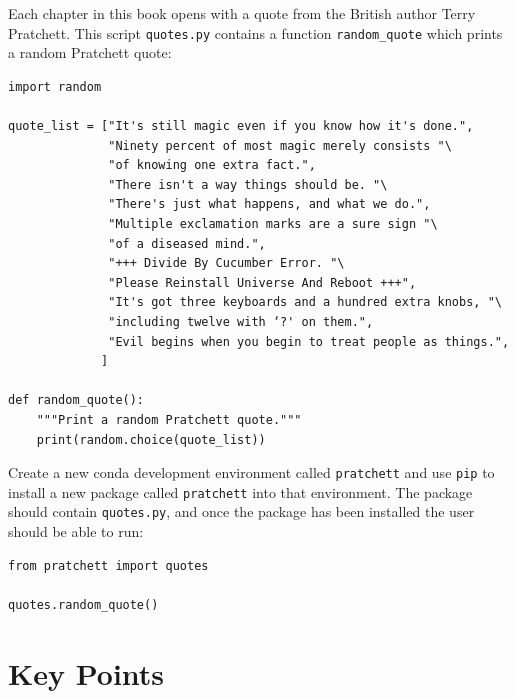 \documentclass[
]{krantz}
\begin{document}
Each chapter in this book opens with a quote from the British author Terry Pratchett.
This script \texttt{quotes.py} contains a function \texttt{random\_quote} which prints a random Pratchett quote:

\begin{verbatim}
import random

quote_list = ["It's still magic even if you know how it's done.",
              "Ninety percent of most magic merely consists "\
              "of knowing one extra fact.",
              "There isn't a way things should be. "\
              "There's just what happens, and what we do.",
              "Multiple exclamation marks are a sure sign "\
              "of a diseased mind.",
              "+++ Divide By Cucumber Error. "\
              "Please Reinstall Universe And Reboot +++",
              "It's got three keyboards and a hundred extra knobs, "\
              "including twelve with ‘?' on them.",
              "Evil begins when you begin to treat people as things.",
             ]
                         
def random_quote():
    """Print a random Pratchett quote."""
    print(random.choice(quote_list))
\end{verbatim}

Create a new conda development environment called \texttt{pratchett}
and use \texttt{pip} to install a new package called \texttt{pratchett} into that environment.
The package should contain \texttt{quotes.py},
and once the package has been installed the user should be able to run:

\begin{verbatim}
from pratchett import quotes

quotes.random_quote()
\end{verbatim}

\hypertarget{packaging-keypoints}{%
\section{Key Points}\label{packaging-keypoints}}
\end{document}
